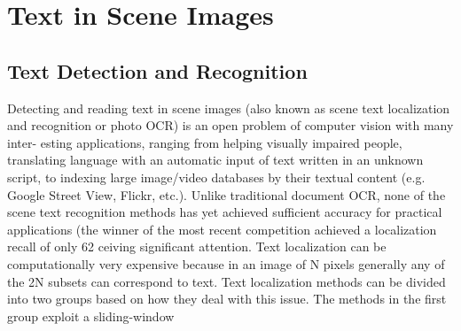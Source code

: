 % 
\section{Text in Scene Images}

\subsection{Text Detection and Recognition}
Detecting and reading text in scene images (also known
as scene text localization and recognition or photo OCR)
is an open problem of computer vision with many inter-
esting applications, ranging from helping visually impaired
people, translating language with an automatic input of text
written in an unknown script, to indexing large image/video
databases by their textual content (e.g. Google Street View,
Flickr, etc.). Unlike traditional document OCR, none of the
scene text recognition methods has yet achieved sufficient
accuracy for practical applications (the winner of the most
recent competition achieved a localization recall of only
62%
ceiving significant attention.
Text localization can be computationally very expensive
because in an image of N pixels generally any of the 2N
subsets can correspond to text. Text localization methods
can be divided into two groups based on how they deal with
this issue.
The methods in the first group exploit a sliding-window

